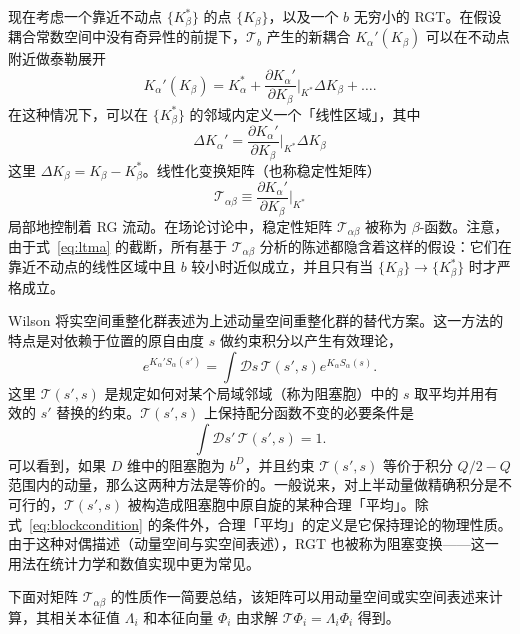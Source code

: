 现在考虑一个靠近不动点 $\{K_\beta^*\}$ 的点 $\{K_\beta\}$，以及一个 $b$ 无穷小的 RGT。在假设耦合常数空间中没有奇异性的前提下，$\mathcal{T}_b$ 产生的新耦合 $K_\alpha'(K_\beta)$ 可以在不动点附近做泰勒展开
\begin{equation}
K_\alpha'(K_\beta) = K_\alpha^* +
    \frac{\partial K_\alpha'}{\partial K_\beta}\bigg|_{K^*}\Delta K_\beta
    + \ldots.
\label{eq:ltma}
\end{equation}
在这种情况下，可以在 $\{K_\beta^*\}$ 的邻域内定义一个「线性区域」，其中
\begin{equation}
\Delta K_\alpha' =
    \frac{\partial K_\alpha'}{\partial K_\beta}\bigg|_{K^*}\Delta K_\beta
\label{eq:ltmb}
\end{equation}
这里 $\Delta K_\beta = K_\beta - K_\beta^*$。线性化变换矩阵（也称稳定性矩阵）
\begin{equation}
\mathcal{T}_{\alpha\beta} \equiv
    \frac{\partial K_\alpha'}{\partial K_\beta}\bigg|_{K^*}
\label{eq:ltmc}
\end{equation}
局部地控制着 RG 流动。在场论讨论中，稳定性矩阵 $\mathcal{T}_{\alpha\beta}$ 被称为
$\beta$-函数。注意，由于式~\ref{eq:ltma} 的截断，所有基于 $\mathcal{T}_{\alpha\beta}$ 分析的陈述都隐含着这样的假设：它们在靠近不动点的线性区域中且 $b$ 较小时近似成立，并且只有当 $\{K_\beta\} \to
\{K_\beta^*\}$ 时才严格成立。

Wilson 将实空间重整化群表述为上述动量空间重整化群的替代方案。这一方法的特点是对依赖于位置的原自由度 $s$ 做约束积分以产生有效理论，
\begin{equation}
e^{K_\alpha'S_\alpha(s')} = \int \mathcal{D}s\,\mathcal{T}(s',s)
    e^{K_\alpha S_\alpha(s)}.
\end{equation}
这里 $\mathcal{T}(s',s)$ 是规定如何对某个局域邻域（称为阻塞胞）中的 $s$ 取平均并用有效的 $s'$ 替换的约束。$\mathcal{T}(s',s)$ 上保持配分函数不变的必要条件是
\begin{equation}
\int \mathcal{D}s'\,\mathcal{T}(s',s) = 1.
\label{eq:blockcondition}
\end{equation}
可以看到，如果 $D$ 维中的阻塞胞为 $b^D$，并且约束 $\mathcal{T}(s',s)$ 等价于积分 $Q/2 - Q$ 范围内的动量，那么这两种方法是等价的。一般说来，对上半动量做精确积分是不可行的，$\mathcal{T}(s',s)$ 被构造成阻塞胞中原自旋的某种合理「平均」。除式~\ref{eq:blockcondition} 的条件外，合理「平均」的定义是它保持理论的物理性质。由于这种对偶描述（动量空间与实空间表述），RGT 也被称为阻塞变换——这一用法在统计力学和数值实现中更为常见。

下面对矩阵 $\mathcal{T}_{\alpha\beta}$ 的性质作一简要总结，该矩阵可以用动量空间或实空间表述来计算，其相关本征值 $\Lambda_i$ 和本征向量 $\Phi_i$ 由求解 $\mathcal{T}\Phi_i =
\Lambda_i\Phi_i$ 得到。

